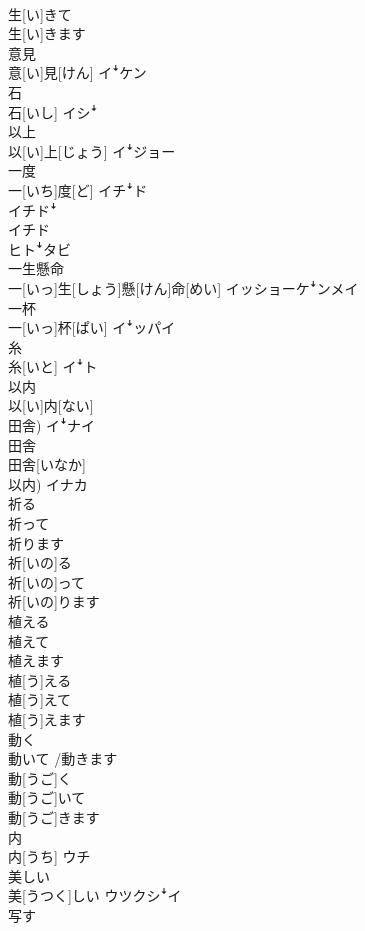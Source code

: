\documentclass[8pt]{extreport}
\begin{document}
\begin{CJK}{UTF8}{min}
\\	生[い]きて 
\\	生[い]きます	
\\	意見	
\\	意[い]見[けん]	イꜜケン
\\	石	
\\	石[いし]	イシꜜ
\\	以上	
\\	以[い]上[じょう]	イꜜジョー
\\	一度	
\\	一[いち]度[ど]	イチꜜド 
\\	イチドꜜ 
\\	イチド 
\\	ヒトꜜタビ
\\	一生懸命	
\\	一[いっ]生[しょう]懸[けん]命[めい]	イッショーケꜜンメイ
\\	一杯	
\\	一[いっ]杯[ぱい]	イꜜッパイ
\\	糸	
\\	糸[いと]	イꜜト
\\	以内	
\\	以[い]内[ない] 
\\	田舎)	イꜜナイ
\\	田舎	
\\	田舎[いなか] 
\\	以内)	イナカ
\\	祈る 
\\	祈って 
\\	祈ります	
\\	祈[いの]る 
\\	祈[いの]って 
\\	祈[いの]ります	
\\	植える 
\\	植えて 
\\	植えます	
\\	植[う]える 
\\	植[う]えて 
\\	植[う]えます	
\\	動く 
\\	動いて /動きます	
\\	動[うご]く 
\\	動[うご]いて 
\\	動[うご]きます	
\\	内	
\\	内[うち]	ウチ
\\	美しい	
\\	美[うつく]しい	ウツクシꜜイ
\\	写す 

\end{CJK}
\end{document}
